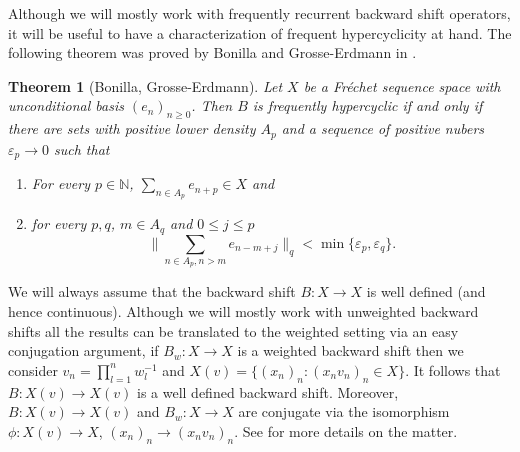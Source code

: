 \documentclass[11pt]{amsart}
\newtheorem{theorem}{Theorem}[section]
\begin{document}
Although we will mostly work with frequently recurrent backward shift operators, it will be useful to have a characterization of frequent hypercyclicity at hand. The following theorem was proved by Bonilla and Grosse-Erdmann in \cite{BonGro18}.
\begin{theorem}[Bonilla, Grosse-Erdmann]\label{caracterizacion hiperciclicidad frecuente} Let $X$ be a Fr\'echet sequence space with unconditional basis $(e_n)_{n\geq 0}$. Then $B$ is frequently hypercyclic if and only if there are sets with positive lower density $A_p$ and a sequence of positive nubers $\varepsilon_p\to 0 $ such that
\begin{enumerate}
    \item For every $p\in\mathbb N$, $\sum_{n\in A_p} e_{n+p}\in X$ and
    \item for every $p,q$, $m\in A_q$ and $0\leq j\leq p$
    $$\|\sum_{n\in A_p,n>m} e_{n-m+j}\|_q<\min\{\varepsilon_p,\varepsilon_q\}.$$
    
\end{enumerate}
\end{theorem}
We will always assume that the backward shift $B:X\to X$ is well defined (and hence continuous). Although we will mostly work with unweighted backward shifts all the results can be translated to the  weighted setting via an easy conjugation argument, if $B_w:X\to X$ is a weighted backward shift then we consider $v_n=\prod_{l=1}^n w_l^{-1}$ and $X(v)=\{(x_n)_n:(x_nv_n)_n\in X\}$. It follows that $B:X(v)\to X(v)$ is a well defined backward shift. Moreover, $B:X(v)\to X(v)$ and $B_w:X\to X$ are conjugate via the isomorphism $\phi: X(v)\to X$, $(x_n)_n\to (x_nv_n)_n $. See \cite{GroPer11,bonilla2025zeroEdinburgh} for more details on the matter.
\end{document}
